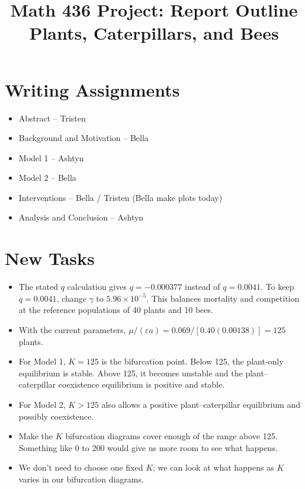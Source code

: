 \documentclass[11pt]{article}
\title{Math 436 Project: Report Outline\\Plants, Caterpillars, and Bees}
\author{}
\date{}
\begin{document}
\maketitle

\section*{Writing Assignments}

\begin{itemize}
    \item Abstract -- Tristen
    \item Background and Motivation -- Bella
    \item Model 1 -- Ashtyn
    \item Model 2 -- Bella
    \item Interventions -- Bella / Tristen (Bella make plots today)
    \item Analysis and Conclusion -- Ashtyn
\end{itemize}

\section*{New Tasks}

\begin{itemize}
    \item The stated $q$ calculation gives $q=-0.000377$ instead of
    $q=0.0041$. To keep $q=0.0041$, change $\gamma$ to
    $5.96\times10^{-5}$. This balances mortality and competition at the
    reference populations of 40 plants and 10 bees.
    \item With the current parameters,
    $\mu/(\varepsilon a)=0.069/[0.40(0.00138)]=125$ plants.
    \item For Model 1, $K=125$ is the bifurcation point. Below 125, the
    plant-only equilibrium is stable. Above 125, it becomes unstable and
    the plant--caterpillar coexistence equilibrium is positive and stable.
    \item For Model 2, $K>125$ also allows a positive plant--caterpillar
    equilibrium and possibly coexistence.
    \item Make the $K$ bifurcation diagrams cover enough of the range above
    125. Something like 0 to 200 would give us more room to see what happens.
    \item We don't need to choose one fixed $K$; we can look at what happens
    as $K$ varies in our bifurcation diagrams.
\end{itemize}
\end{document}
